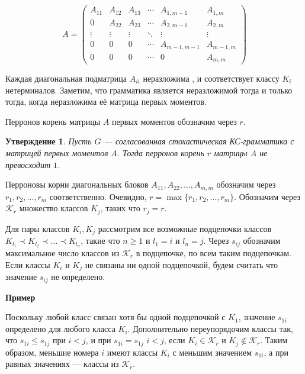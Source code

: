\documentclass[12pt]{article}
\newtheorem{statement}{Утверждение}
\begin{document}
\begin{equation}
	A =
	\begin{pmatrix}
		A_{11} & A_{12} & A_{13} & \cdots & A_{1,m-1} & A_{1,m} \\
		0 & A_{22} & A_{23} & \cdots & A_{2,m-1} & A_{2,m} \\
		\vdots & \vdots & \vdots & \ddots & \vdots & \vdots \\
		0 & 0 & 0 & \cdots & A_{m-1,m-1} & A_{m-1,m} \\
		0 & 0 & 0 & \cdots & 0 & A_{m,m}
	\end{pmatrix}
\end{equation}

Каждая диагональная подматрица $A_{ii}$ неразложима \cite{gantmaher-matrix-theory}, и соответствует классу $K_i$ нетерминалов. Заметим, что грамматика является неразложимой тогда и только тогда, когда неразложима её матрица первых моментов.

Перронов корень \cite{gantmaher-matrix-theory} матрицы $A$ первых моментов обозначим через $r$.

\begin{statement}
	Пусть $G$ --- согласованная стохастическая КС-грамматика с матрицей первых моментов $A$. Тогда перронов корень $r$ матрицы $A$ не превосходит $1$.
\end{statement}

Перроновы корни диагональных блоков $A_{11}, A_{22}, \ldots, A_{m,m}$ обозначим через $r_1, r_2, \ldots, r_m$ соответственно. Очевидно, $r = \max \{r_1, r_2, \ldots, r_m\}$. Обозначим через $\mathcal{K}_r$ множество классов $K_j$, таких что $r_j = r$.

Для пары классов $K_i, K_j$ рассмотрим все возможные подцепочки классов $K_{l_1} \prec K_{l_2} \prec \ldots \prec K_{l_n}$, такие что $n \geq 1$ и $l_1 = i$ и $l_n = j$. Через $s_{ij}$ обозначим максимальное число классов из $\mathcal{K}_r$ в подцепочке, по всем таким подцепочкам. Если классы $K_i$ и $K_j$ не связаны ни одной подцепочкой, будем считать что значение $s_{ij}$ не определено.

\hrulefill
\begin{footnotesize}
	
\textbf{Пример}

\end{footnotesize}
\hrulefill

Поскольку любой класс связан хотя бы одной подцепочкой с $K_1$, значение $s_{1i}$ определено для любого класса $K_i$. Дополнительно переупорядочим классы так, что $s_{1i} \leq s_{1j}$ при $i < j$, и при $s_{1i} = s_{1j}$ $i < j$, если $K_i \in \mathcal{K}_r$ и $K_j \notin \mathcal{K}_r$. Таким образом, меньшие номера $i$ имеют классы $K_i$ с меньшим значением $s_{1i}$, а при равных значениях --- классы из $\mathcal{K}_r$.
\end{document}

